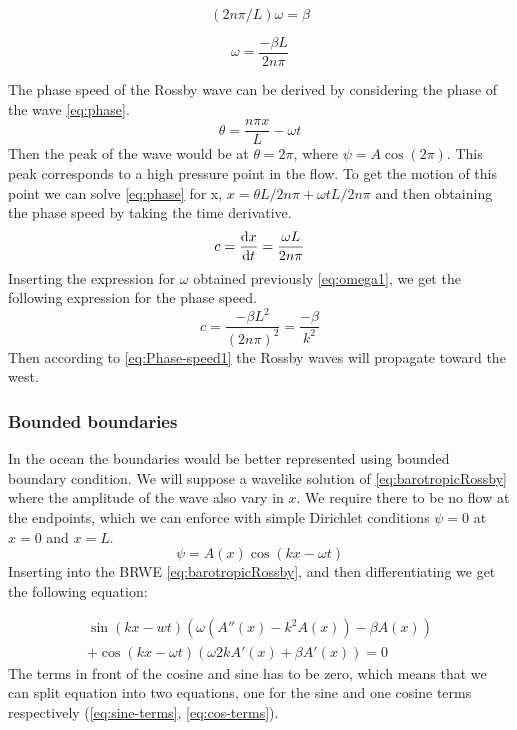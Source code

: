 \begin{equation}
    (2n\pi / L) \omega = \beta
\end{equation}

\begin{equation}\label{eq:omega1}
    \omega = \frac{-\beta L}{2n\pi}
\end{equation}

The phase speed of the Rossby wave can be derived by considering the phase of
the wave \cref{eq:phase}.
\begin{equation}\label{eq:phase}
    \theta = \frac{n \pi x}{L} - \omega t
\end{equation}
Then the peak of the wave would be at $\theta = 2\pi$, where $\psi = A\cos{(2\pi)}$.
This peak corresponds to a high pressure point in the flow. To get the motion of this point we can solve
\cref{eq:phase} for x, $x=\theta L / 2n \pi + \omega t L / 2n \pi$ and then
obtaining the phase speed by taking the time derivative.
\begin{equation}
    c = \dv{x}{t} = \frac{\omega L}{2n\pi}
\end{equation}
Inserting the expression for $\omega$ obtained previously \cref{eq:omega1}, we
get the following expression for the phase speed.
\begin{equation}\label{eq:Phase-speed1}
    c = \frac{-\beta L^2}{(2n\pi)^2} = \frac{-\beta}{k^2}
\end{equation}
Then according to \cref{eq:Phase-speed1} the Rossby waves will propagate
toward the west.
\subsubsection{Bounded boundaries}
In the ocean the boundaries would be better represented using bounded boundary
condition. We will suppose a wavelike solution of \cref{eq:barotropicRossby}
where the amplitude of the wave also vary in $x$. We
require there to be no flow at the endpoints, which we can enforce with simple
Dirichlet conditions $\psi= 0$ at $x=0$ and $x=L$.
\begin{equation}\label{eq:waveSolution2}
    \psi = A(x)\cos{(kx-\omega t)}
\end{equation}
Inserting \label{eq:waveSolution2} into the BRWE
\cref{eq:barotropicRossby}, and then differentiating we get the following
equation:

\begin{equation}\label{eq:step1}
    \begin{split}
    \sin{(kx-wt)\left(\omega(A''(x)-k^2A(x))- \beta A(x)\right)} \\
    + \cos{(kx - \omega t)}\left(\omega 2kA'(x) +\beta A'(x)\right) = 0
    \end{split}
\end{equation}
The terms in front of the cosine and sine has to be zero, which means that we
can split equation into two equations, one for the sine and one cosine
terms respectively (\cref{eq:sine-terms}, \cref{eq:cos-terms}).

